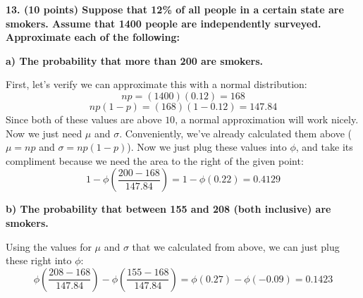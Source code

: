 \documentclass[12pt, letter]{article}
\begin{document}
\textbf{13. (10 points) Suppose that 12\% of all people in a certain state are smokers. Assume that 1400 people are independently surveyed. Approximate each of the following:}

\qquad \textbf{a) The probability that more than 200 are smokers.}
\begin{center}
	First, let's verify we can approximate this with a normal distribution:
	$$np = (1400)(0.12) = 168$$
	$$np(1 - p) = (168)(1 - 0.12) = 147.84$$
	Since both of these values are above $10$, a normal approximation will work nicely. Now we just need $\mu$ and $\sigma$. Conveniently, we've already calculated them above ($\mu = np$ and $\sigma = np(1 - p)$). Now we just plug these values into $\phi$, and take its compliment because we need the area to the right of the given point:
	$$1 - \phi\left(\frac{200 - 168}{147.84}\right) = 1 - \phi(0.22) = \boxed{0.4129}$$
\end{center}

\qquad \textbf{b) The probability that between 155 and 208 (both inclusive) are smokers.}
\begin{center}
	Using the values for $\mu$ and $\sigma$ that we calculated from above, we can just plug these right into $\phi$:
	$$\phi\left(\frac{208 - 168}{147.84}\right) - \phi\left(\frac{155 - 168}{147.84}\right) = \phi(0.27) - \phi(-0.09) = \boxed{0.1423}$$
\end{center}
\end{document}
